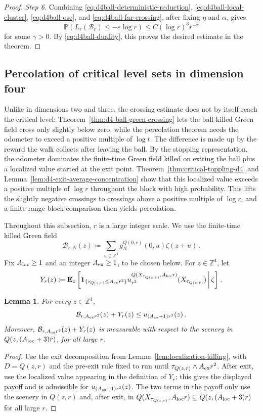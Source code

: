\documentclass[11pt]{amsart}
\theoremstyle{plain}
\newtheorem{lemma}[theorem]{Lemma}
\theoremstyle{definition}
\newcommand{\Z}{\mathbb{Z}}
\renewcommand{\P}{\mathbb{P}}
\newcommand{\one}{\mathbf{1}}
\begin{document}
\begin{proof}
\smallskip
\noindent\emph{Step 6.} Combining \eqref{eq:d4ball-deterministic-reduction},
\eqref{eq:d4ball-local-cluster}, \eqref{eq:d4ball-osc}, and \eqref{eq:d4ball-far-crossing}, after fixing $\eta$ and $\alpha$, gives
\[
    \P\left(L_r(\mathcal B_r)\leq-\varepsilon\log r\right)
    \leq C(\log r)^3r^{-\gamma}
\]
for some $\gamma>0$. By \eqref{eq:d4ball-duality}, this proves the desired estimate in the theorem.  
\end{proof}

\subsection{Percolation of critical level sets in dimension four}

Unlike in dimensions two and three, the crossing estimate does not by itself
reach the critical level: Theorem~\ref{thm:d4-ball-green-crossing} lets the ball-killed Green field cross only slightly below zero, while the percolation theorem needs the odometer to exceed a positive multiple of $\log t$. The difference is made up by the reward the walk collects after leaving the ball. By the stopping representation, the odometer dominates the finite-time Green field killed on exiting the ball plus a localized value started at the exit point. Theorem~\ref{thm:critical-toppling-d4} and Lemma~\ref{lem:d4-exit-average-concentration} show that this localized value exceeds a positive multiple of $\log r$ throughout the block with high probability. This lifts the slightly negative crossings to crossings above a positive multiple of
$\log r$, and a finite-range block comparison then yields percolation.

Throughout this subsection, $r$ is a large integer scale.
We use the finite-time killed Green field
\[
    \mathcal B_{r,N}(z)\coloneqq
    \sum_{u\in\Z^4} g_N^{Q(0,r)}(0,u)\zeta(z+u)\, .
\]
Fix $A_{\rm loc}\geq1$ and an integer $A_{\rm ex}\geq1$, to be chosen below.
For $z\in\Z^4$, let
\[
    Y_r(z)\coloneqq
    \mathbf E_z\left[
        \one_{\{\tau_{Q(z,r)}\leq A_{\rm ex}r^2\}}
        u_{r^2}^{Q(X_{\tau_{Q(z,r)}},A_{\rm loc}r)}
        (X_{\tau_{Q(z,r)}}) \,
        \middle| \, \zeta
    \right]\, .
\]

\begin{lemma}\label{lem:d4-finite-range-lower-bound}
For every $z\in\Z^4$,
\[
    \mathcal B_{r,A_{\rm ex}r^2}(z)+Y_r(z)
    \leq u_{(A_{\rm ex}+1)r^2}(z)\, .
\]
Moreover, $\mathcal B_{r,A_{\rm ex}r^2}(z)+Y_r(z)$ is measurable with respect
to the scenery in $Q(z,(A_{\rm loc}+3)r)$, for all large $r$.
\end{lemma}
\begin{proof}
Use the exit decomposition from Lemma~\ref{lem:localization-killing}, with
$D=Q(z,r)$ and the pre-exit rule fixed to run until
$\tau_{Q(z,r)}\wedge A_{\rm ex}r^2$. After exit, use the localized value
appearing in the definition of $Y_r$; this gives the displayed payoff and is
admissible for $u_{(A_{\rm ex}+1)r^2}(z)$.
The two terms in the payoff only use the scenery in $Q(z,r)$ and, after exit,
in $Q(X_{\tau_{Q(z,r)}},A_{\rm loc}r)\subseteq Q(z,(A_{\rm loc}+3)r)$ for all
large $r$.
\end{proof}
\end{document}

